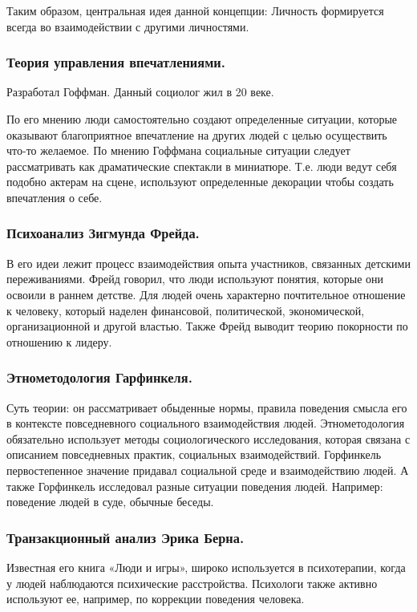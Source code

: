 Таким образом, центральная идея данной концепции: Личность формируется всегда во взаимодействии с другими личностями.

\subsubsection{Теория управления впечатлениями.}
Разработал Гоффман. Данный социолог жил в 20 веке.

По его мнению люди самостоятельно создают определенные ситуации, которые оказывают благоприятное впечатление на других людей с целью осуществить что-то желаемое.
По мнению Гоффмана социальные ситуации следует рассматривать как драматические спектакли в миниатюре.
Т.е. люди ведут себя подобно актерам на сцене, используют определенные декорации чтобы создать впечатления о себе.


\subsubsection{Психоанализ Зигмунда Фрейда.}
В его идеи лежит процесс взаимодействия опыта участников, связанных детскими переживаниями.
Фрейд говорил, что люди используют понятия, которые они освоили в раннем детстве.
Для людей очень характерно почтительное отношение к человеку, который наделен финансовой, политической, экономической, организационной и другой властью.
Также Фрейд выводит теорию покорности по отношению к лидеру.

\subsubsection{Этнометодология Гарфинкеля.}
Суть теории:  он рассматривает обыденные нормы, правила поведения смысла его в контексте повседневного социального взаимодействия людей.
Этнометодология обязательно использует методы социологического исследования, которая связана с описанием повседневных практик, социальных взаимодействий.
Горфинкель первостепенное значение придавал социальной среде и взаимодействию людей.
А также Горфинкель исследовал разные ситуации поведения людей. Например: поведение людей в суде, обычные беседы. 


\subsubsection{Транзакционный анализ Эрика Берна.}
Известная его книга «Люди и игры», широко используется в психотерапии, когда у людей наблюдаются психические расстройства.
Психологи также активно используют ее, например, по коррекции поведения человека.


